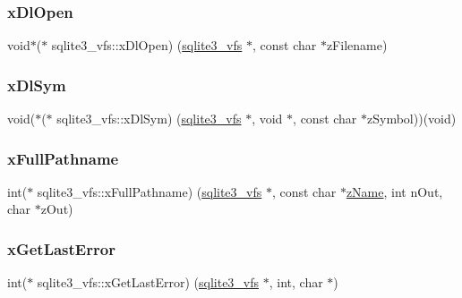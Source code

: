 \mbox{\label{structsqlite3__vfs_a4de0324cd74c8ec98e4605d432f16e0a}} 
\subsubsection{\texorpdfstring{xDlOpen}{xDlOpen}}
{\footnotesize\ttfamily void$\ast$($\ast$ sqlite3\+\_\+vfs\+::x\+Dl\+Open) (\mbox{\hyperlink{structsqlite3__vfs}{sqlite3\+\_\+vfs}} $\ast$, const char $\ast$z\+Filename)}

\mbox{\label{structsqlite3__vfs_a847ba7d9a80164138031aacef1d01507}} 
\subsubsection{\texorpdfstring{xDlSym}{xDlSym}}
{\footnotesize\ttfamily void($\ast$($\ast$ sqlite3\+\_\+vfs\+::x\+Dl\+Sym) (\mbox{\hyperlink{structsqlite3__vfs}{sqlite3\+\_\+vfs}} $\ast$, void $\ast$, const char $\ast$z\+Symbol))(void)}

\mbox{\label{structsqlite3__vfs_ae6573ffda4c4f014960b0ec3a1522dfa}} 
\subsubsection{\texorpdfstring{xFullPathname}{xFullPathname}}
{\footnotesize\ttfamily int($\ast$ sqlite3\+\_\+vfs\+::x\+Full\+Pathname) (\mbox{\hyperlink{structsqlite3__vfs}{sqlite3\+\_\+vfs}} $\ast$, const char $\ast$\mbox{\hyperlink{structsqlite3__vfs_a0f06a27ac2201ea04c0623ef19e5d73e}{z\+Name}}, int n\+Out, char $\ast$z\+Out)}

\mbox{\label{structsqlite3__vfs_ae90895f142cc41801f515ae5e339a3d7}} 
\subsubsection{\texorpdfstring{xGetLastError}{xGetLastError}}
{\footnotesize\ttfamily int($\ast$ sqlite3\+\_\+vfs\+::x\+Get\+Last\+Error) (\mbox{\hyperlink{structsqlite3__vfs}{sqlite3\+\_\+vfs}} $\ast$, int, char $\ast$)}

